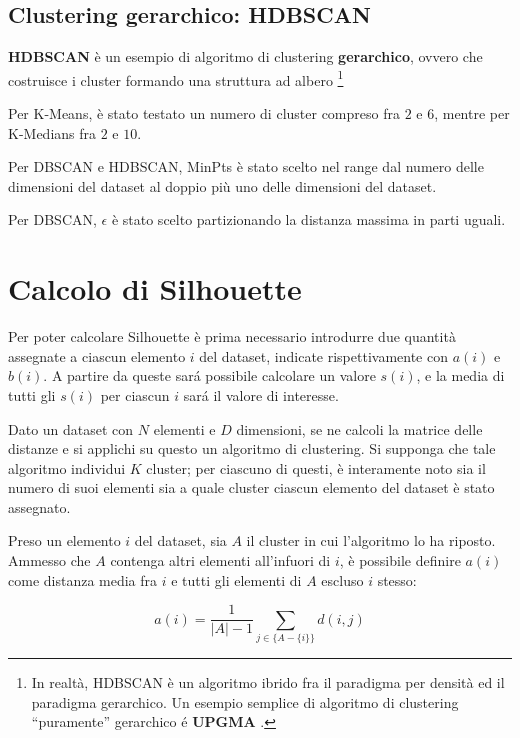 \documentclass[a4paper, 12pt]{report}
\begin{document}
			\subsection{Clustering gerarchico: HDBSCAN}

				\textbf{HDBSCAN} è un esempio di algoritmo di clustering
				\textbf{gerarchico}, ovvero che costruisce i cluster formando
				una struttura ad albero \footnote{In realtà, HDBSCAN è un
				algoritmo ibrido fra il paradigma per densità ed il paradigma
				gerarchico. Un esempio semplice di algoritmo di clustering
				``puramente'' gerarchico é \textbf{UPGMA} \cite{Sokal1958ASM}.}

			Per K-Means, è stato testato un numero di cluster compreso fra $2$ e
			$6$, mentre per K-Medians fra $2$ e $10$.

			Per DBSCAN e HDBSCAN, MinPts è stato scelto nel range dal numero delle
			dimensioni del dataset al doppio più uno delle dimensioni del dataset.

			Per DBSCAN, $\epsilon$ è stato scelto partizionando la distanza massima
			in parti uguali.

		\section{Calcolo di Silhouette}

			Per poter calcolare Silhouette è prima necessario introdurre due
			quantità assegnate a ciascun elemento $i$ del dataset, indicate
			rispettivamente con $a(i)$ e $b(i)$. A partire da queste sará
			possibile calcolare un valore $s(i)$, e la media di tutti gli
			$s(i)$ per ciascun $i$ sará il valore di interesse.

			Dato un dataset con $N$ elementi e $D$ dimensioni, se ne calcoli
			la matrice delle distanze e si applichi su questo un algoritmo
			di clustering. Si supponga che tale algoritmo individui $K$
			cluster; per ciascuno di questi, è interamente noto sia il
			numero di suoi elementi sia a quale cluster ciascun elemento
			del dataset è stato assegnato.

			Preso un elemento $i$ del dataset, sia $A$ il cluster in cui l'algoritmo
			lo ha riposto. Ammesso che $A$ contenga altri elementi all'infuori di $i$,
			è possibile definire $a(i)$ come distanza media fra $i$ e tutti gli elementi
			di $A$ escluso $i$ stesso:

			\begin{equation}
				a(i) = \frac{1}{|A| - 1} \sum_{j \in \{A - \{i\}\}} d(i, j)
			\end{equation}
\end{document}
